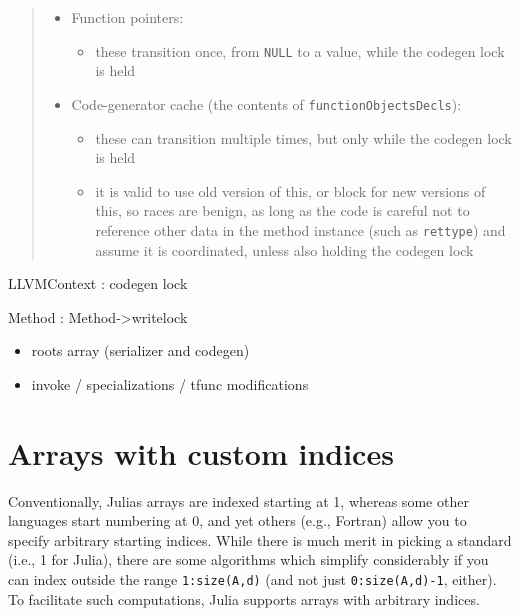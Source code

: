 \begin{quote}
\begin{itemize}
\item Function pointers:

\begin{itemize}
\item these transition once, from \texttt{NULL} to a value, while the codegen lock is held

\end{itemize}

\item Code-generator cache (the contents of \texttt{functionObjectsDecls}):

\begin{itemize}
\item these can transition multiple times, but only while the codegen lock is held


\item it is valid to use old version of this, or block for new versions of this, so races are benign, as long as the code is careful not to reference other data in the method instance (such as \texttt{rettype}) and assume it is coordinated, unless also holding the codegen lock

\end{itemize}
\end{itemize}
\end{quote}


LLVMContext : codegen lock



Method : Method->writelock



\begin{itemize}
\item roots array (serializer and codegen)


\item invoke / specializations / tfunc modifications

\end{itemize}


\hypertarget{10976543622473505620}{}


\section{Arrays with custom indices}



Conventionally, Julia{\textquotesingle}s arrays are indexed starting at 1, whereas some other languages start numbering at 0, and yet others (e.g., Fortran) allow you to specify arbitrary starting indices.  While there is much merit in picking a standard (i.e., 1 for Julia), there are some algorithms which simplify considerably if you can index outside the range \texttt{1:size(A,d)} (and not just \texttt{0:size(A,d)-1}, either). To facilitate such computations, Julia supports arrays with arbitrary indices.



